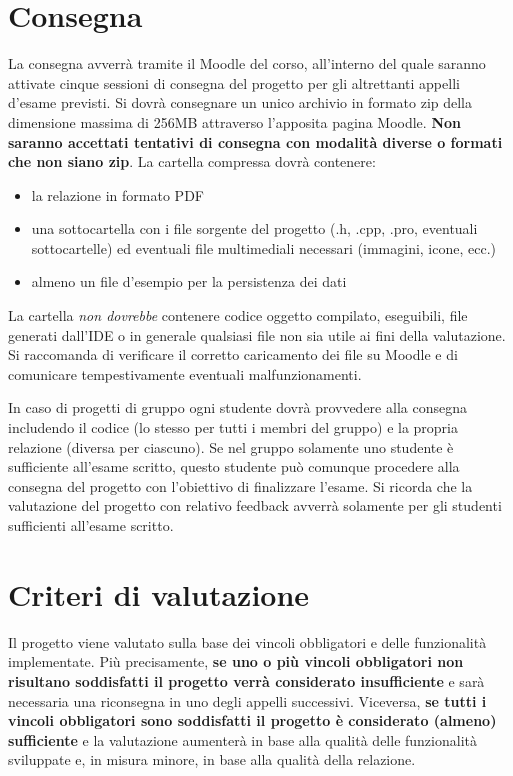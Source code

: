 \documentclass[10pt,a4paper,oneside]{article}
\begin{document}
\section{Consegna}
La consegna avverrà tramite il Moodle del corso, all'interno del quale saranno attivate cinque sessioni di consegna del progetto per gli altrettanti appelli d'esame previsti. Si dovrà consegnare un unico archivio in formato zip della dimensione massima di 256MB attraverso l'apposita pagina Moodle. \textbf{Non saranno accettati tentativi di consegna con modalità diverse o formati che non siano zip}. La cartella compressa dovrà contenere:
\begin{itemize}
 \item la relazione in formato PDF
 \item una sottocartella con i file sorgente del progetto (.h, .cpp, .pro, eventuali sottocartelle) ed eventuali file multimediali necessari (immagini, icone, ecc.)
 \item almeno un file d'esempio per la persistenza dei dati
\end{itemize}
La cartella \emph{non dovrebbe} contenere codice oggetto compilato, eseguibili, file generati dall'IDE o in generale qualsiasi file non sia utile ai fini della valutazione. Si raccomanda di verificare il corretto caricamento dei file su Moodle e di comunicare tempestivamente eventuali malfunzionamenti.

In caso di progetti di gruppo ogni studente dovrà provvedere alla consegna includendo il codice (lo stesso per tutti i membri del gruppo) e la propria relazione (diversa per ciascuno). Se nel gruppo solamente uno studente è sufficiente all'esame scritto, questo studente può comunque procedere alla consegna del progetto con l'obiettivo di finalizzare l'esame.  Si ricorda che la valutazione del progetto con relativo feedback avverrà solamente per gli studenti sufficienti all'esame scritto.


\section{Criteri di valutazione}
Il progetto viene valutato sulla base dei vincoli obbligatori e delle funzionalità implementate. Più precisamente, \textbf{se uno o più vincoli obbligatori non risultano soddisfatti il progetto verrà considerato insufficiente} e sarà necessaria una riconsegna in uno degli appelli successivi. Viceversa, \textbf{se tutti i vincoli obbligatori sono soddisfatti il progetto è considerato (almeno) sufficiente} e la valutazione aumenterà in base alla qualità delle funzionalità sviluppate e, in misura minore, in base alla qualità della relazione.
\end{document}
